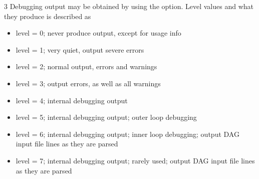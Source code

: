 \begin{ManPage}{\label{man-condor-dagman}}{3}
Debugging output may be obtained by using the
 option.
Level values and what they produce is described as
\begin{itemize}
  \item level = 0; never produce output, 
        except for usage info 
  \item level = 1; very quiet, output severe errors 
  \item level = 2; normal output, errors and warnings
  \item level = 3; output errors, as well as all warnings
  \item level = 4; internal debugging output
  \item level = 5; internal debugging output; outer loop debugging
  \item level = 6; internal debugging output; inner loop debugging;
output DAG input file lines as they are parsed
  \item level = 7; internal debugging output; rarely used;
output DAG input file lines as they are parsed
\end{itemize}



\end{ManPage}
